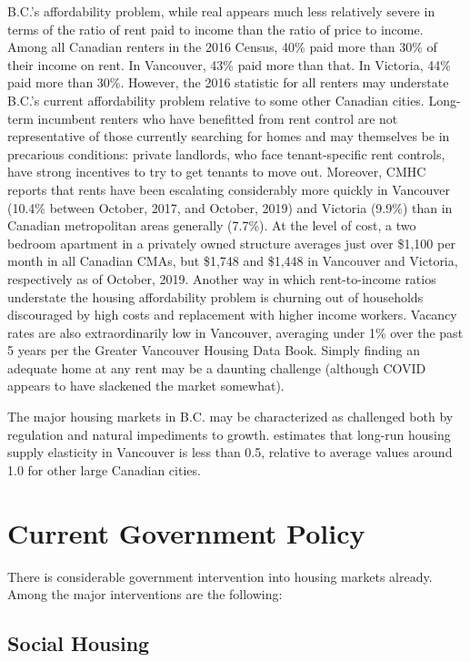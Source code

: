 \documentclass[12pt]{article}
\begin{document}
B.C.'s affordability problem, while real appears much less relatively severe in terms of the ratio of rent paid to income than the ratio of price to income. Among all Canadian renters in the 2016 Census, 40\% paid more than 30\% of their income on rent. In Vancouver, 43\% paid more than that. In Victoria, 44\% paid more than 30\%. However, the 2016 statistic for all renters may understate B.C.'s current affordability problem relative to some other Canadian cities. Long-term incumbent renters who have benefitted from rent control are not representative of those currently searching for homes and may themselves be in precarious conditions: private landlords, who face tenant-specific rent controls, have strong incentives to try to get tenants to move out. Moreover, CMHC reports that rents have been escalating considerably more quickly in Vancouver (10.4\% between October, 2017, and October, 2019) and Victoria (9.9\%) than in Canadian metropolitan areas generally (7.7\%). At the level of cost, a two bedroom apartment in a privately owned structure averages just over \$1,100 per month in all Canadian CMAs, but \$1,748 and \$1,448 in Vancouver and Victoria, respectively as of October, 2019. Another way in which rent-to-income ratios understate the housing affordability problem is churning out of households discouraged by high costs and replacement with higher income workers. Vacancy rates are also extraordinarily low in Vancouver, averaging under 1\% over the past 5 years per the Greater Vancouver Housing Data Book. Simply finding an adequate home at any rent may be a daunting challenge (although COVID appears to have slackened the market somewhat).

The major housing markets in B.C. may be characterized as challenged both by regulation and natural impediments to growth. \textcite{CMHCExpensive} estimates that long-run housing supply elasticity in Vancouver is less than 0.5, relative to average values around 1.0 for other large Canadian cities. 

\section{Current Government Policy}

There is considerable government intervention into housing markets already. Among the major interventions are the following:

\subsection{Social Housing}
\end{document}
